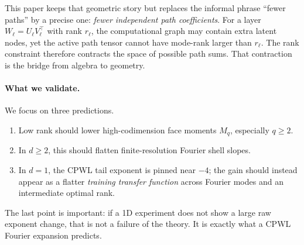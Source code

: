 \documentclass[10pt,twocolumn]{article}
\newcommand{\1}{\mathbf{1}}
\begin{document}
This paper keeps that geometric story but replaces the informal phrase ``fewer paths'' by a precise one: \emph{fewer independent path coefficients}.  For a layer $W_\ell=U_\ell V_\ell^\top$ with rank $r_\ell$, the computational graph may contain extra latent nodes, yet the active path tensor cannot have mode-rank larger than $r_\ell$.  The rank constraint therefore contracts the space of possible path sums.  That contraction is the bridge from algebra to geometry.

\paragraph{What we validate.}
We focus on three predictions.
\begin{enumerate}[leftmargin=1.2em,itemsep=1pt,topsep=2pt]
\item Low rank should lower high-codimension face moments $M_q$, especially $q\ge2$.
\item In $d\ge2$, this should flatten finite-resolution Fourier shell slopes.
\item In $d=1$, the CPWL tail exponent is pinned near $-4$; the gain should instead appear as a flatter \emph{training transfer function} across Fourier modes and an intermediate optimal rank.
\end{enumerate}
The last point is important: if a 1D experiment does not show a large raw exponent change, that is not a failure of the theory.  It is exactly what a CPWL Fourier expansion predicts.
\end{document}
